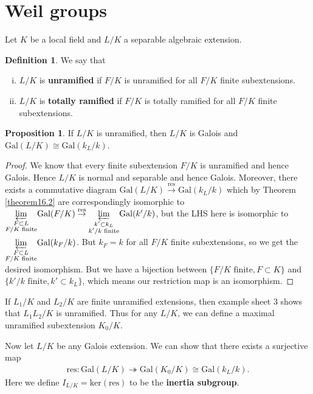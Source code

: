 \documentclass{article}
\theoremstyle{definition}
\newtheorem{prop}[theorem]{Proposition}
\newtheorem{defn}{Definition}[section]
\begin{document}
\section{Weil groups}
Let $K$ be a local field and $L/K$ a separable algebraic extension.
\begin{defn}
    We say that
    \begin{enumerate}[(i)]
        \item $L/K$ is \textbf{unramified} if $F/K$ is unramified for all $F/K$ finite subextensions.
        \item $L/K$ is \textbf{totally ramified} if $F/K$ is totally ramified for all $F/K$ finite subextensions.
    \end{enumerate}
\end{defn}
\begin{prop}
    If $L/K$ is unramified, then $L/K$ is Galois and $\text{Gal}(L/K) \cong \text{Gal}(k_L/k)$.
\end{prop}
\begin{proof}
    We know that every finite subextension $F/K$ is unramified and hence Galois. Hence $L/K$ is normal and separable and hence Galois. Moreover, there exists a commutative diagram $\text{Gal}(L/K) \stackrel{\text{res}}{\to} \text{Gal}(k_L/k)$ which by Theorem \ref{theorem16.2} are correspondingly isomorphic to $\underset{\substack{F \subset L\\F/K \text{ finite}}}{\varprojlim} \text{Gal}(F/K) \stackrel{\text{res}}{\to} \underset{\substack{k' \subset k_L \\ k'/k \text{ finite}}}{\varprojlim} \text{Gal}(k'/k)$, but the LHS here is isomorphic to $\underset{\substack{F \subset L\\F/K \text{ finite}}}{\varprojlim} \text{Gal}(k_F/k)$. But $k_F = k$ for all $F/K$ finite subextensions, so we get the desired isomorphism. But we have a bijection between $\{F/K \text{ finite}, F \subset K\}$ and $\{k'/k \text{ finite}, k' \subset k_L\}$, which means our restriction map is an isomorphism.
\end{proof}
If $L_1/K$ and $L_2/K$ are finite unramified extensions, then example sheet 3 shows that $L_1L_2/K$ is unramified. Thus for any $L/K$, we can define a maximal unramified subextension $K_0/K$. 
\vspace{1mm}
 
Now let $L/K$ be any Galois extension. We can show that there exists a surjective map 
\begin{align*}
    \text{res}: \text{Gal}(L/K) \twoheadrightarrow \text{Gal}(K_0/K) \cong \text{Gal}(k_L/k).
\end{align*}
Here we define $I_{L/K} = \text{ker}(\text{res})$ to be the \textbf{inertia subgroup}.
\vspace{1mm}
 
\end{document}
